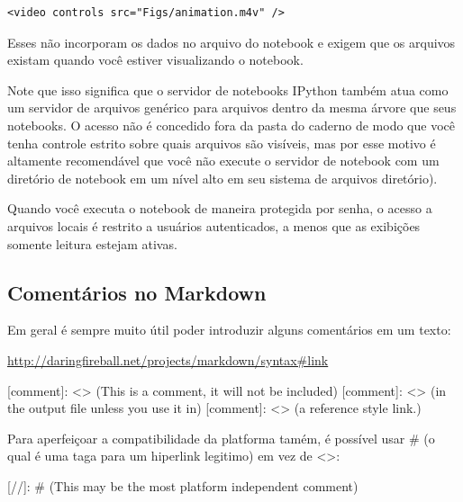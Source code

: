 \documentclass[11pt]{article}
\newenvironment{Shaded}{}{}
\newcommand{\OtherTok}[1]{\textcolor[rgb]{0.00,0.44,0.13}{{#1}}}
\newcommand{\NormalTok}[1]{{#1}}
\begin{document}
\begin{verbatim}
<video controls src="Figs/animation.m4v" />
\end{verbatim}

Esses não incorporam os dados no arquivo do notebook e exigem que os
arquivos existam quando você estiver visualizando o notebook.

    Note que isso significa que o servidor de notebooks IPython também atua
como um servidor de arquivos genérico para arquivos dentro da mesma
árvore que seus notebooks. O acesso não é concedido fora da pasta do
caderno de modo que você tenha controle estrito sobre quais arquivos são
visíveis, mas por esse motivo é altamente recomendável que você não
execute o servidor de notebook com um diretório de notebook em um nível
alto em seu sistema de arquivos diretório).

Quando você executa o notebook de maneira protegida por senha, o acesso
a arquivos locais é restrito a usuários autenticados, a menos que as
exibições somente leitura estejam ativas.

    \subsection{Comentários no Markdown}\label{comentuxe1rios-no-markdown}

Em geral é sempre muito útil poder introduzir alguns comentários em um
texto:

\url{http://daringfireball.net/projects/markdown/syntax\#link}

\begin{Shaded}
\begin{Highlighting}[]
\OtherTok{[comment]: <>} \NormalTok{(This is a comment, it will not be included)}
\OtherTok{[comment]: <>} \NormalTok{(in  the output file unless you use it in)}
\OtherTok{[comment]: <>} \NormalTok{(a reference style link.)}
\end{Highlighting}
\end{Shaded}

Para aperfeiçoar a compatibilidade da platforma tamém, é possível usar
\# (o qual é uma taga para um hiperlink legitimo) em vez de
\textless{}\textgreater{}:

\begin{Shaded}
\begin{Highlighting}[]
\OtherTok{[//]: #} \NormalTok{(This may be the most platform independent comment)}
\end{Highlighting}
\end{Shaded}


    
    
    
    
\end{document}
